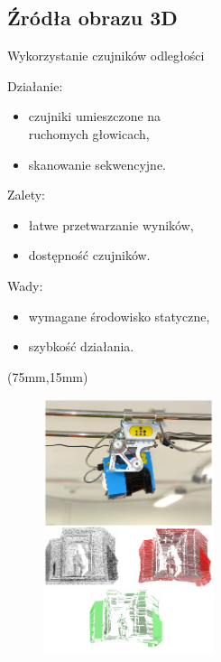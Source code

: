 \documentclass[xcolor=x11names,compress]{beamer}
\renewcommand{\(}{\begin{columns}}
\renewcommand{\)}{\end{columns}}
\newcommand{\<}[1]{\begin{column}{#1}}
\renewcommand{\>}{\end{column}}
\begin{document}
\subsection{Źródła obrazu 3D}
\begin{frame}{Wykorzystanie czujników odległości}

\alert{Działanie:}
\begin{itemize}
\item czujniki umieszczone na\\ruchomych głowicach,
\item skanowanie sekwencyjne.
\end{itemize}

\vspace{.5cm}

\alert{Zalety:}
\begin{itemize}
\item łatwe przetwarzanie wyników,
\item dostępność czujników.
\end{itemize}

\vspace{.5cm}

\alert{Wady:}
\begin{itemize}
\item wymagane środowisko statyczne,
\item szybkość działania.
\end{itemize}

\begin{textblock*}{50mm}(75mm,15mm)%
    \begin{minipage}[l]{50mm}%

	\begin{figure}[h!]
    \centering
    \includegraphics[width=5.0cm]{../Common/img/sick_vert}
    \end{figure}

    \end{minipage}
\end{textblock*}

\end{frame}
\end{document}
